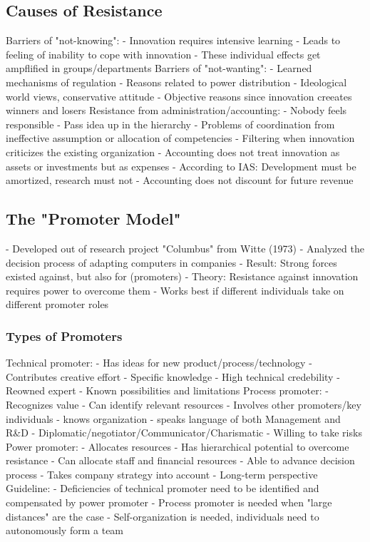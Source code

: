 \documentclass{scrartcl}
\begin{document}
\subsection*{Causes of Resistance}
Barriers of "not-knowing":
- Innovation requires intensive learning
- Leads to feeling of inability to cope with innovation
- These individual effects get ampflified in groups/departments
Barriers of "not-wanting":
- Learned mechanisms of regulation
- Reasons related to power distribution
- Ideological world views, conservative attitude
- Objective reasons since innovation creeates winners and losers
Resistance from administration/accounting:
- Nobody feels responsible
- Pass idea up in the hierarchy
- Problems of coordination from ineffective assumption or allocation of competencies
- Filtering when innovation criticizes the existing organization
- Accounting does not treat innovation as assets or investments but as expenses
- According to IAS: Development must be amortized, research must not
- Accounting does not discount for future revenue
\subsection*{The "Promoter Model"}
- Developed out of research project "Columbus" from Witte (1973)
- Analyzed the decision process of adapting computers in companies
- Result: Strong forces existed against, but also for (promoters)
- Theory: Resistance against innovation requires power to overcome them
- Works best if different individuals take on different promoter roles
\subsubsection*{Types of Promoters}
Technical promoter:
- Has ideas for new product/process/technology
- Contributes creative effort
- Specific knowledge
- High technical credebility
- Reowned expert
- Known possibilities and limitations
Process promoter:
- Recognizes value
- Can identify relevant resources
- Involves other promoters/key individuals
- knows organization
- speaks language of both Management and R\&D
- Diplomatic/negotiator/Communicator/Charismatic
- Willing to take risks
Power promoter:
- Allocates resources
- Has hierarchical potential to overcome resistance
- Can allocate staff and financial resources
- Able to advance decision process
- Takes company strategy into account
- Long-term perspective
Guideline:
- Deficiencies of technical promoter need to be identified and compensated by power promoter
- Process promoter is needed when "large distances" are the case
- Self-organization is needed, individuals need to autonomously form a team
\end{document}

